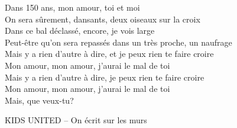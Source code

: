 \documentclass{novel}
\begin{document}
\begin{multicols}{2}
Dans 150 ans, mon amour, toi et moi \\
On sera sûrement, dansants, deux oiseaux sur la croix \\
Dans ce bal déclassé, encore, je vois large \\
Peut-être qu'on sera repassés dans un très proche, un naufrage \\
Mais y a rien d'autre à dire, et je peux rien te faire croire \\
Mon amour, mon amour, j'aurai le mal de toi \\
Mais y a rien d'autre à dire, je peux rien te faire croire \\
Mon amour, mon amour, j'aurai le mal de toi \\
Mais, que veux-tu?
\end{multicols}


\newpage
\normalsize
\h*{KIDS UNITED – On écrit sur les murs}
\end{document}
